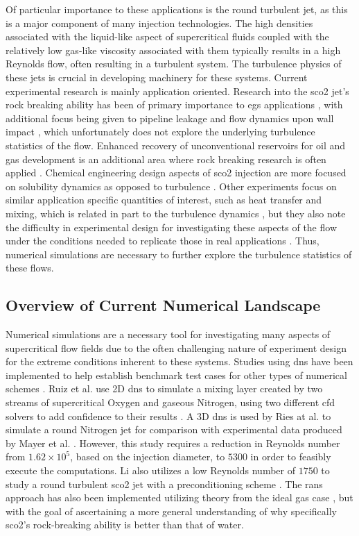 Of particular importance to these applications is the round turbulent jet, as this is a major component of many injection technologies. The high densities associated with the liquid-like aspect of supercritical fluids coupled with the relatively low gas-like viscosity associated with them typically results in a high Reynolds flow, often resulting in a turbulent system. The turbulence physics of these jets is crucial in developing machinery for these systems. Current experimental research is mainly application oriented. Research into the \gls{sco2} jet's rock breaking ability has been of primary importance to \gls{egs} applications \cite{EGScomp, EGS2, very_rock, experiment, rb}, with additional focus being given to pipeline leakage and flow dynamics upon wall impact \cite{WANG2015210, WANG201977}, which unfortunately does not explore the underlying turbulence statistics of the flow. Enhanced recovery of unconventional reservoirs for oil and gas development is an additional area where rock breaking research is often applied \cite{HUANG2020106735, HUANG2019}. Chemical engineering design aspects of \gls{sco2} injection are more focused on solubility dynamics as opposed to turbulence \cite{freejet, pulse_jet}. Other experiments focus on similar application specific quantities of interest, such as heat transfer and mixing, which is related in part to the turbulence dynamics \cite{heated_cyl, 10.1115/FEDSM2022-87029}, but they also note the difficulty in experimental design for investigating these aspects of the flow under the conditions needed to replicate those in real applications \cite{freejet}. Thus, numerical simulations are necessary to further explore the turbulence statistics of these flows.


\subsection{Overview of Current Numerical Landscape}
Numerical simulations are a necessary tool for investigating many aspects of supercritical flow fields due to the often challenging nature of experiment design for the extreme conditions inherent to these systems. Studies using \gls{dns} have been implemented to help establish benchmark test cases for other types of numerical schemes \cite{OVAIS2022, SENGUPTA2019}. Ruiz et al. use 2D \gls{dns} to simulate a mixing layer created by two streams of supercritical Oxygen and gaseous Nitrogen, using two different \gls{cfd} solvers to add confidence to their results \cite{article}. A 3D \gls{dns} is used by Ries at al. to simulate a round Nitrogen jet for comparison with experimental data produced by Mayer et al. \cite{DNS_N}. However, this study requires a reduction in Reynolds number from $1.62 \times 10^5$, based on the injection diameter, to $5300$ in order to feasibly execute the computations. Li also utilizes a low Reynolds number of $1750$ to study a round turbulent \gls{sco2} jet with a preconditioning scheme \cite{Li2012}. The \gls{rans} approach has also been implemented utilizing theory from the ideal gas case \cite{RANS}, but with the goal of ascertaining a more general understanding of why specifically \gls{sco2}'s rock-breaking ability is better than that of water. 

